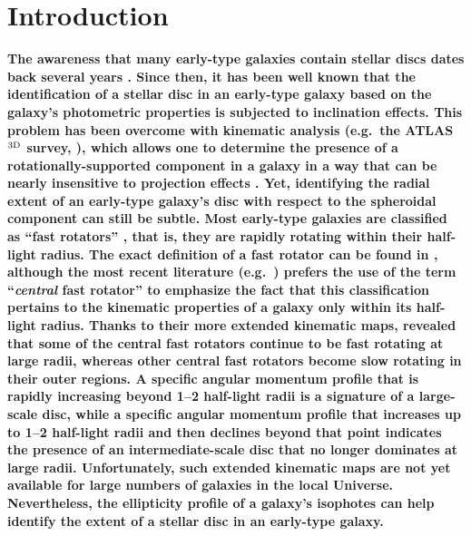 \documentclass[useAMS,usenatbib,article]{mnras}
\begin{document}
\section{Introduction}
\label{sec:int}
{\bf The awareness that many early-type galaxies contain stellar discs dates back several years 
\citep{michard1984,djorgovski1985,carter1987,capaccioli1987,bender1988,bender1990,capaccioli1988,franx1989,
nieto1988,nieto1991,rixwhite1990,rixwhite1992,vandenbergh1990,scorzabender1990,scorzabender1995,
simienmichard1990,cinzanovandermarel1993,donofrio1995,graham1998fornax,scorza1998,scorzavandenbosch1998,bendersaglia1999}. 
Since then, it has been well known that 
the identification of a stellar disc in an early-type galaxy based on the galaxy's photometric properties 
is subjected to inclination effects. 
This problem has been overcome with kinematic analysis (e.g.~the ATLAS$^{\rm 3D}$ survey, \citealt{cappellari2011}), 
which allows one to determine the presence of a rotationally-supported component in a galaxy 
in a way that can be nearly insensitive to projection effects \citep{cappellari2007,emsellem2007}. 
Yet, identifying the radial extent of an early-type galaxy's disc with respect to the spheroidal component can still be subtle. 
Most early-type galaxies are classified as ``fast rotators'' \citep{atlas3dIII,scott2014}, 
that is, they are rapidly rotating within their half-light radius. 
The exact definition of a fast rotator can be found in \cite{emsellem2007}, 
although the most recent literature (e.g.~\citealt{arnold2011n3115,romanowskyfall2012,arnold2014}) 
prefers the use of the term ``\emph{central} fast rotator'' 
to emphasize the fact that this classification pertains to the kinematic properties of a galaxy only within its half-light radius.
Thanks to their more extended kinematic maps, 
\cite{arnold2014} revealed that some of the central fast rotators continue to be fast rotating at large radii, 
whereas other central fast rotators become slow rotating in their outer regions.
A specific angular momentum profile that is rapidly increasing beyond 1--2 half-light radii 
is a signature of a large-scale disc, 
while a specific angular momentum profile that increases up to 1--2 half-light radii and then declines beyond that point 
indicates the presence of an intermediate-scale disc that no longer dominates at large radii. 
Unfortunately, such extended kinematic maps are not yet available for large numbers of galaxies in the local Universe. 
Nevertheless, the ellipticity profile of a galaxy's isophotes can help identify the extent of a stellar disc in an early-type galaxy. \\
}
\end{document}
